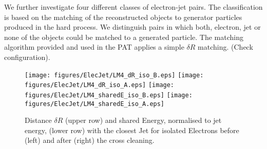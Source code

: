 \documentclass{cmspaper}
\begin{document}
We further investigate four different classes of electron-jet pairs. The
classification is based on the matching of the reconstructed objects
to generator particles produced in the hard process. We distinguish pairs in
which both, electron, jet or none of the objects could be matched to a generated
particle. The matching algorithm provided and used in the PAT applies a simple
$\delta R$ matching. {\color{red}(Check configuration)}.




\begin{figure}[hb]
\begin{center}
    \texttt{[image: figures/ElecJet/LM4\_dR\_iso\_B.eps]}
    \texttt{[image: figures/ElecJet/LM4\_dR\_iso\_A.eps]}
    \texttt{[image: figures/ElecJet/LM4\_sharedE\_iso\_B.eps]}
    \texttt{[image: figures/ElecJet/LM4\_sharedE\_iso\_A.eps]}
    \caption{Distance \(\delta R\) (upper row) and shared Energy, normalised to jet energy, (lower row) with the closest Jet for isolated Electrons before (left) and after (right) the cross cleaning.}
\label{fig:dR_sE_ElecJet_iso}
\end{center}
\end{figure}

\end{document}
